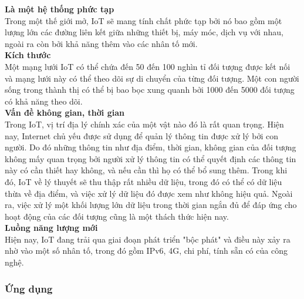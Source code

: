 \documentclass[a4paper,12pt,oneside]{article}
\begin{document}
\noindent \textbf{Là một hệ thống phức tạp}\\
\noindent Trong một thế giới mở, IoT sẽ mang tính chất phức tạp bởi nó bao gồm một lượng lớn các đường liên kết giữa những thiết bị, máy móc, dịch vụ với nhau, ngoài ra còn bởi khả năng thêm vào các nhân tố mới.\\

\noindent \textbf{Kích thước}\\
\noindent Một mạng lưới IoT có thể chứa đến 50 đến 100 nghìn tỉ đối tượng được kết nối và mạng lưới này có thể theo dõi sự di chuyển của từng đối tượng. Một con người sống trong thành thị có thể bị bao bọc xung quanh bởi 1000 đến 5000 đối tượng có khả năng theo dõi.\\

\noindent \textbf{Vấn đề không gian, thời gian}\\
\noindent Trong IoT, vị trí địa lý chính xác của một vật nào đó là rất quan trọng. Hiện nay, Internet chủ yếu được sử dụng để quản lý thông tin được xử lý bởi con người. Do đó những thông tin như địa điểm, thời gian, không gian của đối tượng không mấy quan trọng bởi người xử lý thông tin có thể quyết định các thông tin này có cần thiết hay không, và nếu cần thì họ có thể bổ sung thêm. Trong khi đó, IoT về lý thuyết sẽ thu thập rất nhiều dữ liệu, trong đó có thể có dữ liệu thừa về địa điểm, và việc xử lý dữ liệu đó được xem như không hiệu quả. Ngoài ra, việc xử lý một khối lượng lớn dữ liệu trong thời gian ngắn đủ để đáp ứng cho hoạt động của các đối tượng cũng là một thách thức hiện nay.\\

\noindent \textbf{Luồng năng lượng mới}\\
\noindent Hiện nay, IoT đang trải qua giai đoạn phát triển "bộc phát" và điều này xảy ra nhờ vào một số nhân tố, trong đó gồm IPv6, 4G, chi phí, tính sẵn có của công nghệ.\\

\subsubsection{Ứng dụng}
\end{document}
